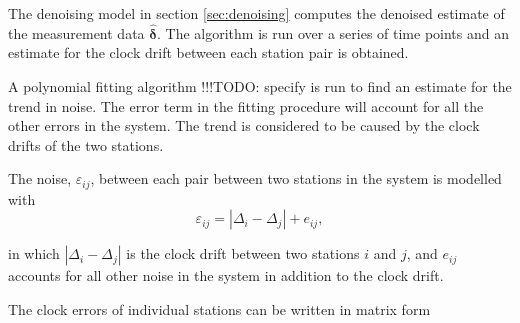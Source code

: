 \documentclass[12pt,a4paper,english]{article}
\newcommand\todo[1]{{\color{red}!!!TODO: #1}}
\begin{document}
The denoising model in section \ref{sec:denoising} computes the denoised estimate of the measurement data $\bm{\hat{\delta}}$. The algorithm is run over a series of time points and an estimate for the clock drift between each station pair is obtained. 

A polynomial fitting algorithm \todo{specify} is run to find an estimate for the trend in noise. The error term in the fitting procedure will account for all the other errors in the system. The trend is considered to be caused by the clock drifts of the two stations. 

The noise, $\varepsilon_{ij}$, between each pair between two stations in the system is modelled with 
\begin{equation}
\varepsilon_{ij} = | \Delta_i - \Delta_j | + e_{ij},
\end{equation}

in which $ | \Delta_i - \Delta_j | $ is the clock drift between two stations $i$ and $j$, and $e_{ij}$ accounts for all other noise in the system in addition to the clock drift. 

The clock errors of individual stations can be written in matrix form 
\end{document}
